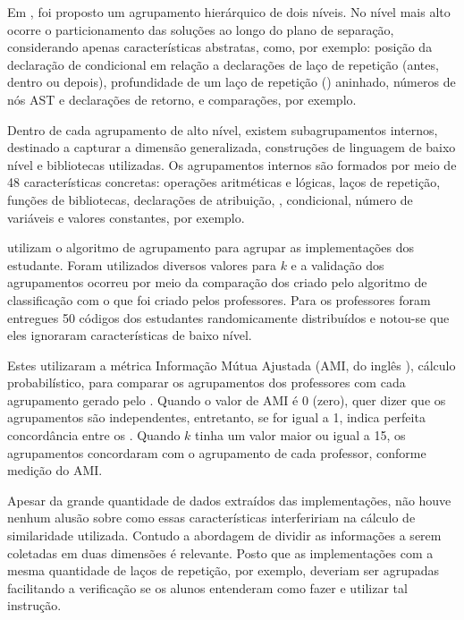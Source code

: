 	    Em , foi proposto um agrupamento hierárquico de dois
	    níveis. No nível mais alto ocorre o particionamento das soluções ao longo do
	    plano de separação, considerando apenas características abstratas, como, por
	    exemplo: posição da declaração de condicional em relação a declarações de laço
	    de repetição (antes, dentro ou depois), profundidade de um laço de repetição
	    () aninhado, números de nós AST e declarações de retorno,
	     e comparações, por exemplo.
	    
	    Dentro de cada agrupamento de alto nível, existem subagrupamentos internos,
	    destinado a capturar a dimensão generalizada, construções de linguagem de
	    baixo nível e bibliotecas utilizadas. Os agrupamentos internos são formados
	    por meio de 48 características concretas: operações aritméticas e lógicas,
	    laços de repetição, funções de bibliotecas, declarações de atribuição,
	    , condicional, número de variáveis e valores constantes,
	    por exemplo.
	    
	     utilizam o algoritmo de agrupamento 
	    para agrupar as implementações dos estudante. Foram utilizados diversos valores
	    para $k$ e a validação dos agrupamentos ocorreu por meio da comparação dos
	     criado pelo algoritmo de classificação com o que foi criado
	    pelos professores. Para os professores foram entregues 50 códigos dos estudantes
	    randomicamente distribuídos e notou-se que eles ignoraram características de baixo nível.
	    
	    Estes utilizaram a métrica Informação Mútua Ajustada (AMI, do inglês
	    ), cálculo probabilístico, para comparar
	    os agrupamentos dos professores com cada agrupamento gerado pelo .
	    Quando o valor de AMI é 0 (zero), quer dizer que os agrupamentos são
	    independentes, entretanto, se for igual a 1, indica perfeita concordância
	    entre os . Quando $k$ tinha um valor maior ou igual a 15,
	    os agrupamentos concordaram com o agrupamento de cada professor, conforme
	    medição do AMI.
	    
	    Apesar da grande quantidade de dados extraídos das implementações, não houve
	    nenhum alusão sobre como essas características interfeririam na cálculo de
	    similaridade utilizada. Contudo a abordagem de dividir as informações a serem
	    coletadas em duas dimensões é relevante. Posto que as implementações com
	    a mesma quantidade de laços de repetição, por exemplo, deveriam ser agrupadas
	    facilitando a verificação se os alunos entenderam como fazer e utilizar
	    tal instrução.
	    
